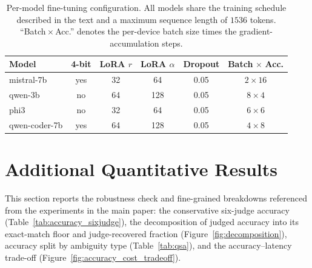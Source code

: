 \documentclass[letterpaper]{article}
\begin{document}
\begin{table}[t]
\centering
\small
\begin{tabular}{@{}lccccc@{}}
\toprule
\textbf{Model} & \textbf{4-bit} & \textbf{LoRA }$r$ & \textbf{LoRA }$\alpha$ & \textbf{Dropout} & \textbf{Batch}$\,\times\,$\textbf{Acc.} \\
\midrule
mistral-7b     & yes & 32 & 64  & 0.05 & $2\times16$ \\
qwen-3b        & no  & 64 & 128 & 0.05 & $8\times4$  \\
phi3           & no  & 32 & 64  & 0.05 & $6\times6$  \\
qwen-coder-7b  & yes & 64 & 128 & 0.05 & $4\times8$  \\
\bottomrule
\end{tabular}
\caption{Per-model fine-tuning configuration. All models share the training schedule described in the text and a maximum sequence length of $1536$ tokens. ``Batch\,$\times$\,Acc.'' denotes the per-device batch size times the gradient-accumulation steps.}
\label{tab:hparams}
\end{table}

\section{Additional Quantitative Results}
\label{app:results}

This section reports the robustness check and fine-grained breakdowns referenced from the experiments in the main paper: the conservative six-judge accuracy (Table~\ref{tab:accuracy_sixjudge}), the decomposition of judged accuracy into its exact-match floor and judge-recovered fraction (Figure~\ref{fig:decomposition}), accuracy split by ambiguity type (Table~\ref{tab:qsa}), and the accuracy--latency trade-off (Figure~\ref{fig:accuracy_cost_tradeoff}).
\end{document}
